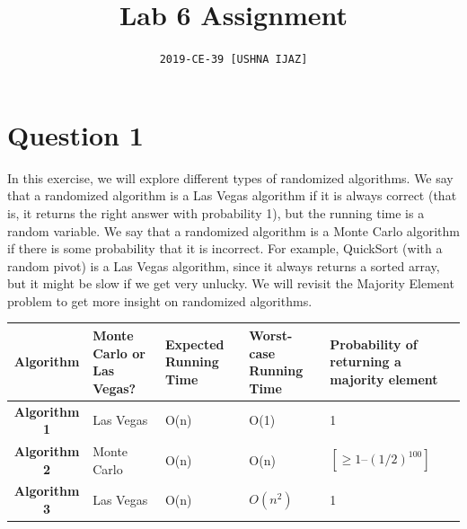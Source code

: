 \documentclass{article}
\begin{document}
\title{\textbf{Lab 6 Assignment}}
\author{\texttt{2019-CE-39 [USHNA IJAZ]}}
\maketitle

\section*{Question 1}
In this exercise, we will explore different types of randomized algorithms. We say that a
randomized algorithm is a Las Vegas algorithm if it is always correct (that is, it returns
the right answer with probability 1), but the running time is a random variable. We say that
a randomized algorithm is a Monte Carlo algorithm if there is some probability that it is
incorrect. For example, QuickSort (with a random pivot) is a Las Vegas algorithm, since it
always returns a sorted array, but it might be slow if we get very unlucky.
We will revisit the Majority Element problem to get more insight on randomized
algorithms.
\begin{center}
\begin{tabular}{|c|p{3cm}|p{3cm}|p{3cm}|p{3cm}|}
\hline
\textbf{Algorithm} & \textbf{Monte Carlo or Las Vegas?} & \textbf{Expected Running Time}
& \textbf{Worst-case Running Time} & \textbf{Probability of returning a majority element} \\
\hline
\textbf{Algorithm 1} & Las Vegas & O(n) & O(1) & 1 \\
\hline
\textbf{Algorithm 2} & Monte Carlo & O(n) &O(n) &$[\ge 1 – (1/2)^{100}]$ \\
\hline
\textbf{Algorithm 3} &Las Vegas &O(n) &$O(n^2)$ & 1 \\
\hline
\end{tabular}
\end{center}
\end{document}
